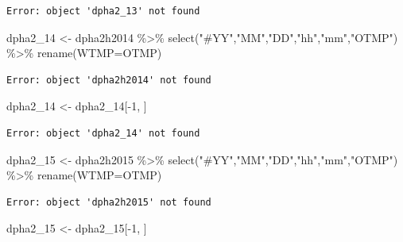 \documentclass[
  letterpaper,
  DIV=11,
  numbers=noendperiod]{scrreprt}
\newenvironment{Shaded}{\begin{snugshade}}{\end{snugshade}}
\newcommand{\AttributeTok}[1]{\textcolor[rgb]{0.40,0.45,0.13}{#1}}
\newcommand{\DecValTok}[1]{\textcolor[rgb]{0.68,0.00,0.00}{#1}}
\newcommand{\FunctionTok}[1]{\textcolor[rgb]{0.28,0.35,0.67}{#1}}
\newcommand{\NormalTok}[1]{\textcolor[rgb]{0.00,0.23,0.31}{#1}}
\newcommand{\OtherTok}[1]{\textcolor[rgb]{0.00,0.23,0.31}{#1}}
\newcommand{\SpecialCharTok}[1]{\textcolor[rgb]{0.37,0.37,0.37}{#1}}
\newcommand{\StringTok}[1]{\textcolor[rgb]{0.13,0.47,0.30}{#1}}
\begin{document}
\begin{verbatim}
Error: object 'dpha2_13' not found
\end{verbatim}

\begin{Shaded}
\begin{Highlighting}[]
\NormalTok{dpha2\_14 }\OtherTok{\textless{}{-}}\NormalTok{ dpha2h2014 }\SpecialCharTok{\%\textgreater{}\%} \FunctionTok{select}\NormalTok{(}\StringTok{"\#YY"}\NormalTok{,}\StringTok{"MM"}\NormalTok{,}\StringTok{"DD"}\NormalTok{,}\StringTok{"hh"}\NormalTok{,}\StringTok{"mm"}\NormalTok{,}\StringTok{"OTMP"}\NormalTok{) }\SpecialCharTok{\%\textgreater{}\%}
   \FunctionTok{rename}\NormalTok{(}\AttributeTok{WTMP=}\NormalTok{OTMP)}
\end{Highlighting}
\end{Shaded}

\begin{verbatim}
Error: object 'dpha2h2014' not found
\end{verbatim}

\begin{Shaded}
\begin{Highlighting}[]
\NormalTok{dpha2\_14 }\OtherTok{\textless{}{-}}\NormalTok{ dpha2\_14[}\SpecialCharTok{{-}}\DecValTok{1}\NormalTok{, ]}
\end{Highlighting}
\end{Shaded}

\begin{verbatim}
Error: object 'dpha2_14' not found
\end{verbatim}

\begin{Shaded}
\begin{Highlighting}[]
\NormalTok{dpha2\_15 }\OtherTok{\textless{}{-}}\NormalTok{ dpha2h2015 }\SpecialCharTok{\%\textgreater{}\%} \FunctionTok{select}\NormalTok{(}\StringTok{"\#YY"}\NormalTok{,}\StringTok{"MM"}\NormalTok{,}\StringTok{"DD"}\NormalTok{,}\StringTok{"hh"}\NormalTok{,}\StringTok{"mm"}\NormalTok{,}\StringTok{"OTMP"}\NormalTok{) }\SpecialCharTok{\%\textgreater{}\%}
   \FunctionTok{rename}\NormalTok{(}\AttributeTok{WTMP=}\NormalTok{OTMP)}
\end{Highlighting}
\end{Shaded}

\begin{verbatim}
Error: object 'dpha2h2015' not found
\end{verbatim}

\begin{Shaded}
\begin{Highlighting}[]
\NormalTok{dpha2\_15 }\OtherTok{\textless{}{-}}\NormalTok{ dpha2\_15[}\SpecialCharTok{{-}}\DecValTok{1}\NormalTok{, ]}
\end{Highlighting}
\end{Shaded}
\end{document}
